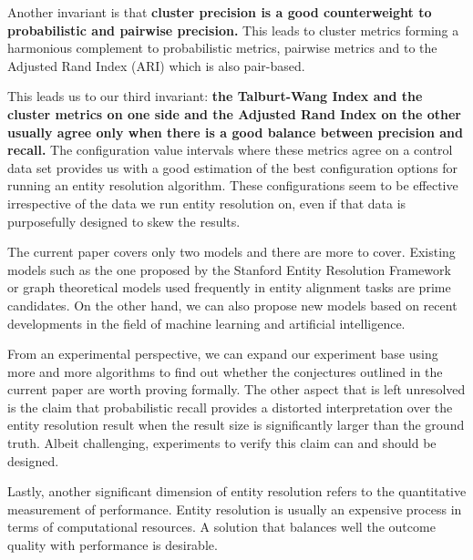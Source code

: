 \documentclass[journal]{IEEEtran}
\begin{document}
    Another invariant is that \textbf{cluster precision is a good counterweight
    to probabilistic and pairwise precision.}
    This leads to cluster metrics forming a harmonious complement to
    probabilistic metrics, pairwise metrics and to the Adjusted Rand Index (ARI)
    which is also pair-based.
    
    This leads us to our third invariant: \textbf{the Talburt-Wang Index and the
    cluster metrics on one side and the Adjusted Rand Index on the other usually
    agree only when there is a good balance between precision and recall.}
    The configuration value intervals where these metrics agree on a control
    data set provides us with a good estimation of the best configuration
    options for running an entity resolution algorithm.
    These configurations seem to be effective irrespective of the data we run
    entity resolution on, even if that data is purposefully designed to skew the
    results.


    The current paper covers only two models and there are more to cover.
    Existing models such as the one proposed by the Stanford Entity Resolution
    Framework\cite{Ben2009Swoosh} or graph theoretical models used frequently in
    entity alignment tasks are prime candidates.
    On the other hand, we can also propose new models based on recent
    developments in the field of machine learning and artificial intelligence.

    From an experimental perspective, we can expand our experiment base using
    more and more algorithms to find out whether the conjectures outlined in
    the current paper are worth proving formally.
    The other aspect that is left unresolved is the claim that probabilistic
    recall provides a distorted interpretation over the entity resolution result
    when the result size is significantly larger than the ground truth.
    Albeit challenging, experiments to verify this claim can and should be
    designed.

    Lastly, another significant dimension of entity resolution refers to the
    quantitative measurement of performance.
    Entity resolution is usually an expensive process in terms of computational
    resources.
    A solution that balances well the outcome quality with performance is
    desirable.


    \balance

    
    
\end{document}
